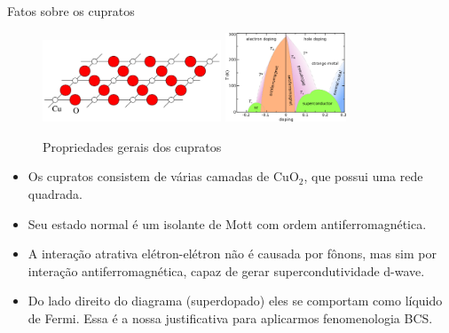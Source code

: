 \documentclass[8pt,aspectratio=169,xcolor={table,dvipsnames,usenames}]{beamer}
\begin{document}


\begin{frame}{Fatos sobre os cupratos}

\begin{figure}
\centering
   \includegraphics[width=0.475\textwidth]{fig/cuo2.png}
   \quad \quad
   \includegraphics[width=0.32\textwidth]{fig/cuprate-phasediag.png}
   \caption{Propriedades gerais dos cupratos}
\end{figure}


\centering
\begin{minipage}[b]{0.75\textwidth}
  \begin{itemize}
  \item Os cupratos consistem de várias camadas de CuO$_2$, que possui uma rede quadrada.
  \item Seu estado normal é um isolante de Mott com ordem antiferromagnética.
  \item A interação atrativa elétron-elétron não é causada por fônons, mas sim por interação antiferromagnética, capaz de gerar supercondutividade d-wave.
  \item Do lado direito do diagrama (superdopado) eles se comportam como líquido de Fermi. Essa é a nossa justificativa para aplicarmos fenomenologia BCS.
  \end{itemize}
\end{minipage}

\end{frame}
\end{document}
